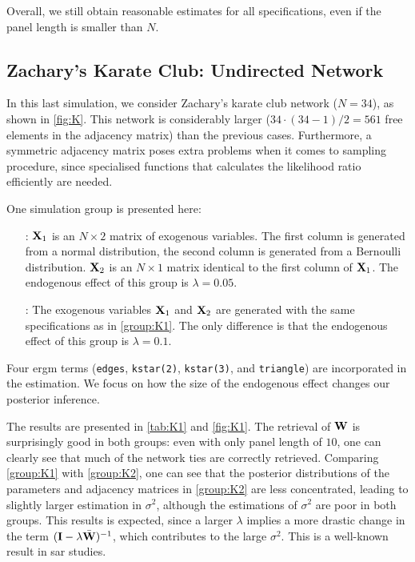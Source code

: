 \documentclass[a4paper]{article}
\begin{document}
\dinkus

Overall, we still obtain reasonable estimates for all specifications,
even if the panel length is smaller than $N$.

\subsection{Zachary's Karate Club: Undirected Network}\label{subsec:K}




In this last simulation, we consider Zachary's karate club network ($N=34$), as shown in \autoref{fig:K}.
This network is considerably larger ($34\cdot(34-1)/2=561$ free elements in the adjacency matrix)
than the previous cases.
Furthermore, a symmetric adjacency matrix poses extra problems when it comes to sampling procedure,
since specialised functions that calculates the likelihood ratio efficiently are needed.

One simulation group is presented here:
\begin{itemize}[leftmargin=]
	\item[\itemlabel{group:K1}{Group K1}:]
		$\mathbf{X}_1$ is an $N\times 2$ matrix of exogenous variables.
		The first column is generated from a normal distribution,
		the second column is generated from a Bernoulli distribution.
		$\mathbf{X}_2$ is an $N\times 1$ matrix identical to the first column of $\mathbf{X}_1$.
		The endogenous effect of this group is $\lambda=0.05$.
	\item[\itemlabel{group:K2}{Group K2}:]
		The exogenous variables $\mathbf{X}_1$ and $\mathbf{X}_2$ are generated with the same specifications as in \ref{group:K1}.
		The only difference is that the endogenous effect of this group is $\lambda=0.1$.
\end{itemize}
Four \gls{ergm} terms
(\Verb"edges", \Verb"kstar(2)", \Verb"kstar(3)", and \Verb"triangle") are incorporated in the estimation.
We focus on how the size of the endogenous effect changes our posterior inference.

The results are presented in \autoref{tab:K1} and \autoref{fig:K1}.
The retrieval of $\mathbf{W}$ is surprisingly good in both groups:
even with only panel length of $10$,
one can clearly see that much of the network ties are correctly retrieved.
Comparing \ref{group:K1} with \ref{group:K2},
one can see that the posterior distributions of the parameters and adjacency matrices in \ref{group:K2} are less concentrated,
leading to slightly larger estimation in $\sigma^2$, although the estimations of $\sigma^2$ are poor in both groups.
This results is expected, since a larger $\lambda$ implies a more drastic change in the term $(\mathbf{I}-\lambda\bar{\mathbf{W}})^{-1}$,
which contributes to the large $\sigma^2$.
This is a well-known result in \gls{sar} studies.
\end{document}
